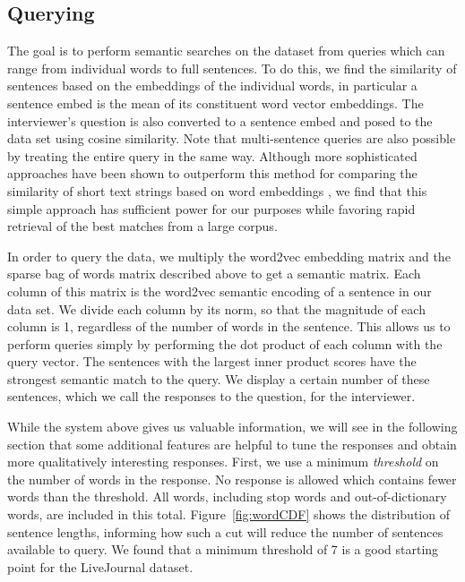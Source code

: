 \documentclass{sigchi}
\begin{document}
\subsection{Querying}

The goal is to perform semantic searches on the dataset from queries which can range from individual words to full sentences. To do this, we find the similarity of sentences based on the embeddings of the individual words, in particular a sentence embed is the mean of its constituent word vector embeddings. The interviewer's question is also converted to a sentence embed and posed to the data set using cosine similarity. Note that multi-sentence queries are also possible by treating the entire query in the same way. Although more sophisticated approaches have been shown to outperform this method for comparing the similarity of short text strings based on word embeddings \cite{kenter15short}, we find that this simple approach has sufficient power for our purposes while favoring rapid retrieval of the best matches from a large corpus. 

In order to query the data, we multiply the word2vec embedding matrix and the sparse bag of words matrix described above to get a semantic matrix. Each column of this matrix is the word2vec semantic encoding of a sentence in our data set. We divide each column by its norm, so that the magnitude of each column is 1, regardless of the number of words in the sentence. This allows us to perform queries simply by performing the dot product of each column with the query vector. The sentences with the largest inner product scores have the strongest semantic match to the query. We display a certain number of these sentences, which we call the responses to the question, for the interviewer.

While the system above gives us valuable information, we will see in the following section that some additional features are helpful to tune the responses and obtain more qualitatively interesting responses. First, we use a minimum {\em threshold} on the number of words in the response. No response is allowed which contains fewer words than the threshold. All words, including stop words and out-of-dictionary words, are included in this total. Figure~\ref{fig:wordCDF} shows the distribution of sentence lengths, informing how such a cut will reduce the number of sentences available to query. We found that a minimum threshold of 7 is a good starting point for the LiveJournal dataset.
\end{document}
